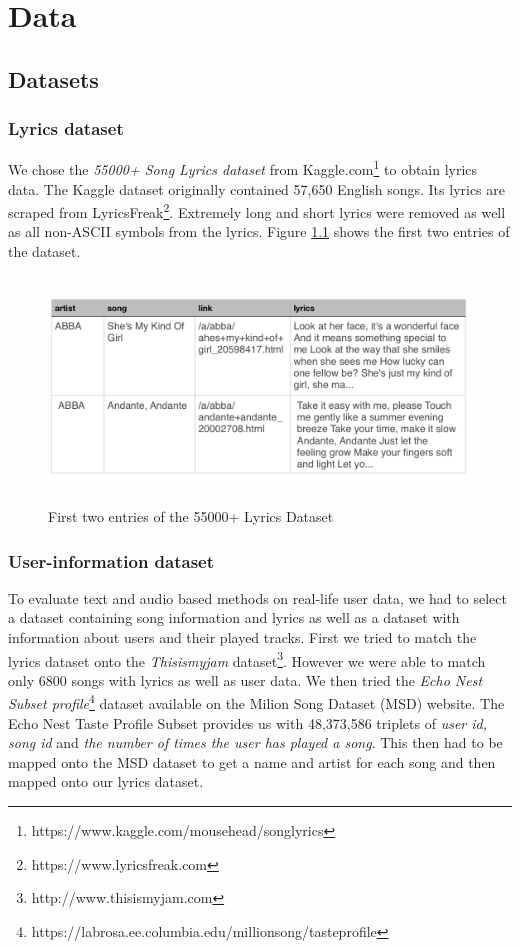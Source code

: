 \chapter{Data}

\section{Datasets}

\subsection{Lyrics dataset}
 We chose the \textit{55000+ Song Lyrics dataset} from
 Kaggle.com\footnote{https://www.kaggle.com/mousehead/songlyrics} to obtain lyrics
 data. The Kaggle dataset originally contained 57,650 English songs. Its lyrics are
 scraped from LyricsFreak\footnote{https://www.lyricsfreak.com}. Extremely long and short lyrics were removed as well as
 all non-ASCII symbols from the lyrics. Figure \ref{fig:lyrics_dataset} shows the
 first two entries of the dataset.\\
 \begin{figure}[h]
    \centering
	\includegraphics[height=60mm]{./img/dataset_preview.png}
	\caption{First two entries of the 55000+ Lyrics Dataset}
	\label{fig:lyrics_dataset}
\end{figure}

\subsection{User-information dataset}
To evaluate text and audio based methods on real-life user data, we had to select a
dataset containing song information and lyrics as well as a dataset with information
about users and their played tracks. First we tried to match the lyrics dataset onto
the \textit{Thisismyjam} dataset\footnote{http://www.thisismyjam.com}. However we
were able to match only 6800 songs with lyrics as well as user data. We then tried
the \textit{Echo Nest Subset profile}\footnote{https://labrosa.ee.columbia.edu/millionsong/tasteprofile} \cite{Bertin-Mahieux2011} dataset available
on the Milion Song Dataset (MSD) website. 
The Echo Nest Taste Profile Subset provides us with 48,373,586 triplets of
\textit{user id, song id} and \textit{the number of times the user has played a
song}. This then had to be mapped onto the MSD dataset to get a name and artist for each song and then mapped onto our lyrics dataset.

